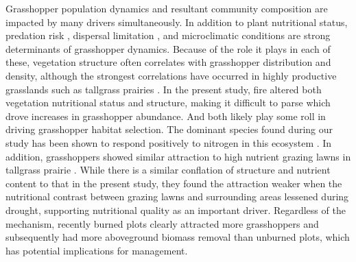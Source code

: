 \documentclass[referee, 
	            sn-basic]
           {sn-jnl}
\begin{document}
\begin{linenumbers}
Grasshopper population dynamics and resultant community composition are impacted by many drivers simultaneously. In addition to plant nutritional status, predation risk \citep{schmitz1997}, dispersal limitation \citep{hawlena2010}, and microclimatic conditions \citep{bauer2007, gardiner2008} are strong determinants of grasshopper dynamics. Because of the role it plays in each of these, vegetation structure often correlates with grasshopper distribution and density, although the strongest correlations have occurred in highly productive grasslands such as tallgrass prairies \citep{joern2004}. In the present study, fire altered both vegetation nutritional status and structure, making it difficult to parse which drove increases in grasshopper abundance. And both likely play some roll in driving grasshopper habitat selection. The dominant species found during our study has been shown to respond positively to nitrogen in this ecosystem \citep{branson2003}. In addition, grasshoppers showed similar attraction to high nutrient grazing lawns in tallgrass prairie \citep{ozment2021}. While there is a similar conflation of structure and nutrient content to that in the present study, they found the attraction weaker when the nutritional contrast between grazing lawns and surrounding areas lessened during drought, supporting nutritional quality as an important driver. Regardless of the mechanism, recently burned plots clearly attracted more grasshoppers and subsequently had more aboveground biomass removal than unburned plots, which has potential implications for management. 



\end{linenumbers}
\end{document}
